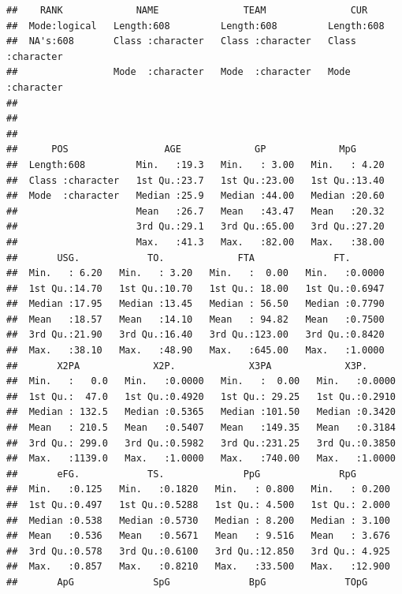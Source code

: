 \documentclass[
]{article}
\begin{document}
\begin{verbatim}
##    RANK             NAME               TEAM               CUR           
##  Mode:logical   Length:608         Length:608         Length:608        
##  NA's:608       Class :character   Class :character   Class :character  
##                 Mode  :character   Mode  :character   Mode  :character  
##                                                                         
##                                                                         
##                                                                         
##      POS                 AGE             GP             MpG       
##  Length:608         Min.   :19.3   Min.   : 3.00   Min.   : 4.20  
##  Class :character   1st Qu.:23.7   1st Qu.:23.00   1st Qu.:13.40  
##  Mode  :character   Median :25.9   Median :44.00   Median :20.60  
##                     Mean   :26.7   Mean   :43.47   Mean   :20.32  
##                     3rd Qu.:29.1   3rd Qu.:65.00   3rd Qu.:27.20  
##                     Max.   :41.3   Max.   :82.00   Max.   :38.00  
##       USG.            TO.             FTA              FT.        
##  Min.   : 6.20   Min.   : 3.20   Min.   :  0.00   Min.   :0.0000  
##  1st Qu.:14.70   1st Qu.:10.70   1st Qu.: 18.00   1st Qu.:0.6947  
##  Median :17.95   Median :13.45   Median : 56.50   Median :0.7790  
##  Mean   :18.57   Mean   :14.10   Mean   : 94.82   Mean   :0.7500  
##  3rd Qu.:21.90   3rd Qu.:16.40   3rd Qu.:123.00   3rd Qu.:0.8420  
##  Max.   :38.10   Max.   :48.90   Max.   :645.00   Max.   :1.0000  
##       X2PA             X2P.             X3PA             X3P.       
##  Min.   :   0.0   Min.   :0.0000   Min.   :  0.00   Min.   :0.0000  
##  1st Qu.:  47.0   1st Qu.:0.4920   1st Qu.: 29.25   1st Qu.:0.2910  
##  Median : 132.5   Median :0.5365   Median :101.50   Median :0.3420  
##  Mean   : 210.5   Mean   :0.5407   Mean   :149.35   Mean   :0.3184  
##  3rd Qu.: 299.0   3rd Qu.:0.5982   3rd Qu.:231.25   3rd Qu.:0.3850  
##  Max.   :1139.0   Max.   :1.0000   Max.   :740.00   Max.   :1.0000  
##       eFG.            TS.              PpG              RpG        
##  Min.   :0.125   Min.   :0.1820   Min.   : 0.800   Min.   : 0.200  
##  1st Qu.:0.497   1st Qu.:0.5288   1st Qu.: 4.500   1st Qu.: 2.000  
##  Median :0.538   Median :0.5730   Median : 8.200   Median : 3.100  
##  Mean   :0.536   Mean   :0.5671   Mean   : 9.516   Mean   : 3.676  
##  3rd Qu.:0.578   3rd Qu.:0.6100   3rd Qu.:12.850   3rd Qu.: 4.925  
##  Max.   :0.857   Max.   :0.8210   Max.   :33.500   Max.   :12.900  
##       ApG              SpG              BpG              TOpG      

\end{verbatim}
\end{document}
